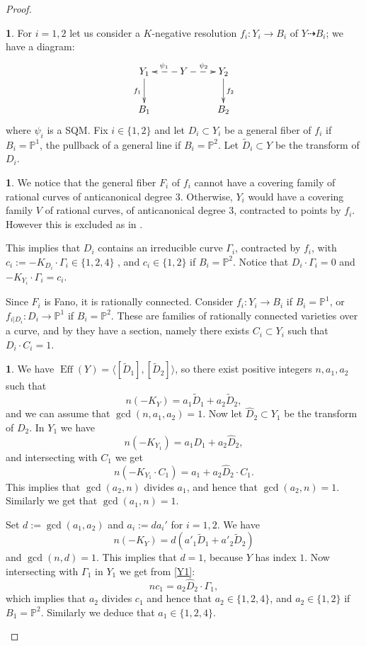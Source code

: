 \documentclass[10pt,a4paper]{amsart}
\theoremstyle{definition}
\newtheorem{prg}[thm]{}
\numberwithin{figure}{section}
\numberwithin{table}{section}
\newcommand{\w}{\widetilde}
\newcommand{\pr}{\mathbb{P}}
\newcommand{\Eff}{\operatorname{Eff}}
\begin{document}
\begin{proof}
\begin{prg}
For $i=1,2$ let us consider a $K$-negative resolution 
 $f_i\colon Y_i\to B_i$ of $Y\dasharrow B_i$;
we have a diagram:
$$\xymatrix{{Y_1}\ar[d]_{f_1}&Y\ar@{-->}[l]_{\psi_1}\ar@{-->}[r]^{\psi_2}&{Y_2}\ar[d]^{f_2}\\
{B_1}&&{B_2}
}$$
where $\psi_i$ is a SQM.
Fix $i\in\{1,2\}$ and let $D_i\subset Y_i$ be a general fiber of $f_i$ if $B_i=\pr^1$, the pullback of a general line if $B_i=\pr^2$.
Let $\w{D}_i\subset Y$ be the transform of $D_i$.
\end{prg}
  \begin{prg}
    We notice that
    the general fiber $F_i$ of $f_i$ cannot have a covering family of rational curves of anticanonical degree $3$.
    Otherwise, $Y_i$ would have a covering family $V$ of rational curves, of anticanonical degree $3$, contracted to points by $f_i$. However this is excluded as in \cite[4.24]{blowup}.

    This implies that $D_i$ contains an irreducible curve $\Gamma_i$, contracted by $f_i$,  with $c_i:=-K_{D_i}\cdot \Gamma_i\in\{1,2,4\}$ \cite[Cor.~IV.1.15]{kollar}, and $c_i\in\{1,2\}$ if $B_i=\pr^2$.  Notice that $D_i\cdot\Gamma_i=0$ and $-K_{Y_i}\cdot\Gamma_i=c_i$.

    Since $F_i$ is Fano, it is rationally connected.
Consider $f_i\colon Y_i\to B_i$ if $B_i=\pr^1$, or
$f_{i|D_i}\colon D_i\to\pr^1$ 
 if $B_i=\pr^2$. These are families of rationally connected varieties over a curve, and 
by \cite{GraberHarrisStarr} they have a section, namely
there exists $C_i\subset Y_i$ such that  $D_i\cdot C_i=1$.
    \end{prg}
  \begin{prg}\label{colorado}
We have $\Eff(Y)=\langle[\w{D}_1],[\w{D}_2]\rangle$, so there exist positive integers $n,a_1,a_2$ such that
$$n(-K_Y)=a_1\w{D}_1+a_2\w{D}_2,$$
and we can assume that $\gcd(n,a_1,a_2)=1$. 
Now let $\widehat{D}_2\subset Y_1$ be the transform of $D_2$. In $Y_1$ we have 
\begin{equation}\label{Y1}
n(-K_{Y_1})=a_1D_1+a_2\widehat{D}_2,
\end{equation}
 and intersecting with $C_1$ we get 
$$n(-K_{Y_1}\cdot C_1)=a_1+a_2\widehat{D}_2\cdot C_1.$$
This implies that $\gcd(a_2,n)$ divides $a_1$, and hence that $\gcd(a_2,n)=1$. Similarly we get that $\gcd(a_1,n)=1$.

Set $d:=\gcd(a_1,a_2)$ and  $a_i:=da_i'$ for $i=1,2$. 
We have
$$n(-K_Y)=d(a'_1\w{D}_1+a'_2\w{D}_2)$$
and $\gcd(n,d)=1$. This implies that $d=1$, because $Y$ has index $1$. 
Now intersecting with $\Gamma_1$ in $Y_1$ we get from \eqref{Y1}:
$$nc_1=a_2\widehat{D}_2\cdot\Gamma_1,$$
which implies that $a_2$ divides $c_1$ and hence that $a_2\in\{1,2,4\}$, and $a_2\in\{1,2\}$ if $B_1=\pr^2$.
Similarly we deduce that $a_1\in\{1,2,4\}$.


\end{prg}
\end{proof}
\end{document}
